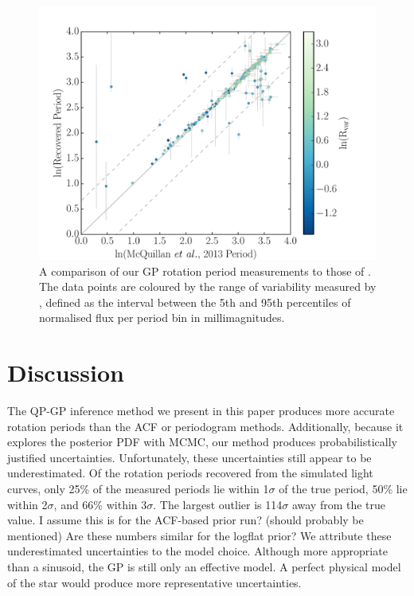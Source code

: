 \documentclass[useAMS, usenatbib, preprint, 12pt]{aastex}
\newcommand{\tdmcomment}[1]{{\color{blue}#1}}
\begin{document}
\begin{figure}
\begin{center}
\includegraphics[width=6in, clip=true]{figures/comparison_koi_02_03.pdf}
\caption[Comparison with McQuillan results.]
{A comparison of our GP rotation period measurements to those of
\citet{Mcquillan2013}.
The data points are coloured by the range of variability measured by
    \citet{Mcquillan2013}, defined as the interval between the 5th and 95th
    percentiles of normalised flux per period bin in millimagnitudes.}
\label{fig:mcquillan}
\end{center}
\end{figure}

\section{Discussion}
\label{sec:discussion}

The QP-GP inference method we present in this paper produces
more accurate rotation periods than the ACF or periodogram methods.
Additionally, because it explores the posterior PDF with MCMC,
our method produces probabilistically justified uncertainties.
Unfortunately, these uncertainties still appear to be underestimated.
Of the rotation periods recovered from the simulated light curves, only 25\%
of the measured periods lie within 1$\sigma$ of the true period,
50\% lie within 2$\sigma$, and 66\% within 3$\sigma$.
The largest outlier is 114$\sigma$ away from the true value.
\tdmcomment{I assume this is for the ACF-based prior run? (should probably be mentioned)
Are these numbers similar for the logflat prior?}
We attribute these underestimated uncertainties to the model choice.
Although more appropriate than a sinusoid, the GP is still only an
 effective model.
A perfect physical model of the star would produce more representative
uncertainties.
\end{document}

